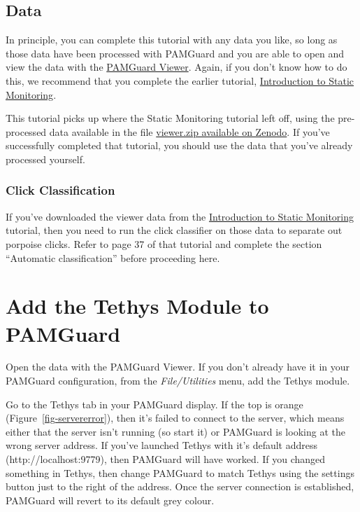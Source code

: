\documentclass[
]{article}
\begin{document}
\subsection{Data}\label{data}

In principle, you can complete this tutorial with any data you like, so
long as those data have been processed with PAMGuard and you are able to
open and view the data with the
\href{https://www.pamguard.org/olhelp/overview/PamMasterHelp/docs/viewerMode.html}{PAMGuard
Viewer}. Again, if you don't know how to do this, we recommend that you
complete the earlier tutorial,
\href{https://www.pamguard.org/tutorials/staticmonitoring.html}{Introduction
to Static Monitoring}.

This tutorial picks up where the Static Monitoring tutorial left off,
using the pre-processed data available in the file
\href{https://zenodo.org/records/13880212}{viewer.zip available on
Zenodo}. If you've successfully completed that tutorial, you should use
the data that you've already processed yourself.

\subsubsection{Click Classification}\label{sec-species}

If you've downloaded the viewer data from the
\href{https://www.pamguard.org/tutorials/staticmonitoring.html}{Introduction
to Static Monitoring} tutorial, then you need to run the click
classifier on those data to separate out porpoise clicks. Refer to page
37 of that tutorial and complete the section ``Automatic
classification'' before proceeding here.

\section{Add the Tethys Module to
PAMGuard}\label{add-the-tethys-module-to-pamguard}

Open the data with the PAMGuard Viewer. If you don't already have it in
your PAMGuard configuration, from the \emph{File/Utilities} menu, add
the Tethys module.

Go to the Tethys tab in your PAMGuard display. If the top is orange
(Figure~\ref{fig-servererror}), then it's failed to connect to the
server, which means either that the server isn't running (so start it)
or PAMGuard is looking at the wrong server address. If you've launched
Tethys with it's default address (http://localhost:9779), then PAMGuard
will have worked. If you changed something in Tethys, then change
PAMGuard to match Tethys using the settings button just to the right of
the address. Once the server connection is established, PAMGuard will
revert to its default grey colour.
\end{document}
